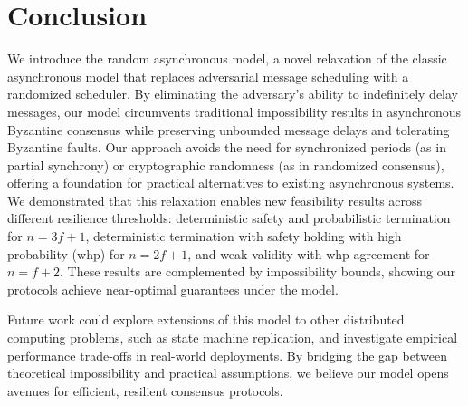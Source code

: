 \section{Conclusion}

We introduce the random asynchronous model, a novel relaxation of the classic asynchronous model that replaces adversarial message scheduling with a randomized scheduler. By eliminating the adversary’s ability to indefinitely delay messages, our model circumvents traditional impossibility results in asynchronous Byzantine consensus while preserving unbounded message delays and tolerating Byzantine faults. Our approach avoids the need for synchronized periods (as in partial synchrony) or cryptographic randomness (as in randomized consensus), offering a foundation for practical alternatives to existing asynchronous systems. 
%
We demonstrated that this relaxation enables new feasibility results across different resilience thresholds: deterministic safety and probabilistic termination for $n=3f+1$, deterministic termination with safety holding with high probability (whp) for $n=2f+1$, and weak validity with whp agreement for $n=f+2$. These results are complemented by impossibility bounds, showing our protocols achieve near-optimal guarantees under the model. 

Future work could explore extensions of this model to other distributed computing problems, such as state machine replication, and investigate empirical performance trade-offs in real-world deployments. By bridging the gap between theoretical impossibility and practical assumptions, we believe our model opens avenues for efficient, resilient consensus protocols.

